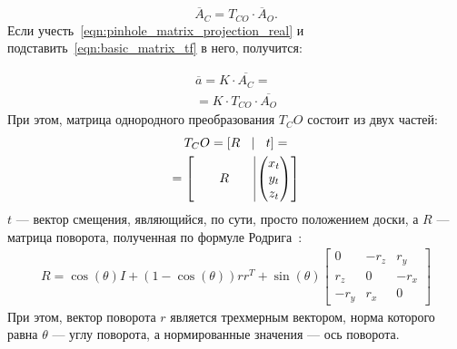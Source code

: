 \documentclass[12pt, a4paper]{article}
\begin{document}
\begin{equation}
    \overline{A}_C = T_{CO} \cdot \overline{A}_O.
\label{eqn:basic_matrix_tf}
\end{equation}
Если учесть~\eqref{eqn:pinhole_matrix_projection_real} и
подставить~\eqref{eqn:basic_matrix_tf} в него, получится:

\begin{equation}
\begin{gathered}
    \overline{a} = K \cdot \overline{A_C} = \\
    = K \cdot T_{CO} \cdot \overline{A_O}
\end{gathered}
\label{eqn:full_projection}
\end{equation}
При этом, матрица однородного преобразования $T_CO$ состоит из двух частей:
\begin{equation}
\begin{gathered}
    T_CO = \left[ R \quad \vline \quad t \right] = \\
    = \left[
        \qquad R \qquad \vline \begin{pmatrix}
        x_t\\
        y_t\\
        z_t
    \end{pmatrix}
    \right]
\end{gathered}
\label{eqn:projection_matrix_tf}
\end{equation}
$t$ --- вектор смещения, являющийся, по сути, просто положением доски, а $R$ ---
матрица поворота, полученная по формуле Родрига~\cite{opencv_rodrigues}:
\begin{equation}
\begin{gathered}
    R = \cos(\theta) I + (1 - \cos(\theta))r r^T + \sin(\theta) \begin{bmatrix}
         0   & -r_z & r_y\\
        r_z  & 0    & -r_x\\
        -r_y & r_x  & 0
    \end{bmatrix}
\end{gathered}
\label{eqn:rodrigues_formula}
\end{equation}
При этом, вектор поворота $r$ является трехмерным вектором, норма которого равна
$\theta$ --- углу поворота, а нормированные значения --- ось поворота.
\end{document}
